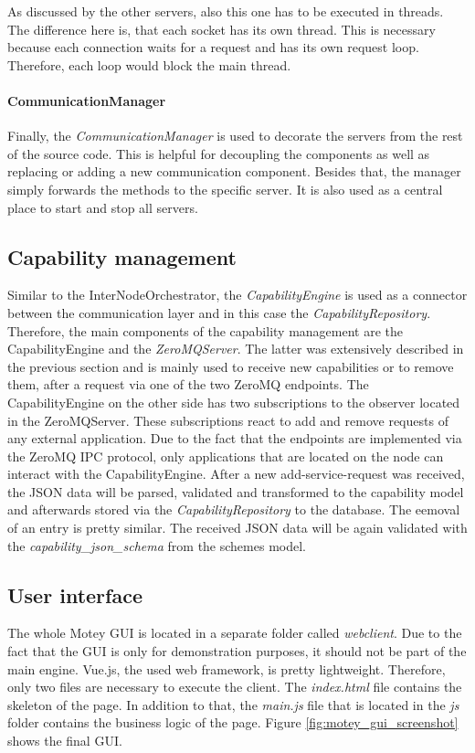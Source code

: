 As discussed by the other servers, also this one has to be executed in threads.
The difference here is, that each socket has its own thread.
This is necessary because each connection waits for a request and has its own request loop.
Therefore, each loop would block the main thread.

\paragraph{CommunicationManager}
Finally, the \textit{CommunicationManager} is used to decorate the servers from the rest of the source code.
This is helpful for decoupling the components as well as replacing or adding a new communication component.
Besides that, the manager simply forwards the methods to the specific server.
It is also used as a central place to start and stop all servers.


\subsection{Capability management}
Similar to the InterNodeOrchestrator, the \textit{CapabilityEngine} is used as a connector between the communication layer and in this case the \textit{CapabilityRepository}.
Therefore, the main components of the capability management are the CapabilityEngine and the \textit{ZeroMQServer}.
The latter was extensively described in the previous section and is mainly used to receive new capabilities or to remove them, after a request via one of the two ZeroMQ endpoints.
The CapabilityEngine on the other side has two subscriptions to the observer located in the ZeroMQServer.
These subscriptions react to add and remove requests of any external application.
Due to the fact that the endpoints are implemented via the ZeroMQ \ac{IPC} protocol, only applications that are located on the node can interact with the CapabilityEngine.
After a new add-service-request was received, the \ac{JSON} data will be parsed, validated and transformed to the capability model and afterwards stored via the \textit{CapabilityRepository} to the database.
The eemoval of an entry is pretty similar.
The received \ac{JSON} data will be again validated with the \textit{capability\_json\_schema} from the schemes model.


\subsection{User interface}
The whole Motey \ac{GUI} is located in a separate folder called \textit{webclient}.
Due to the fact that the \ac{GUI} is only for demonstration purposes, it should not be part of the main engine.
Vue.js, the used web framework, is pretty lightweight.
Therefore, only two files are necessary to execute the client.
The \textit{index.html} file contains the skeleton of the page.
In addition to that, the \textit{main.js} file that is located in the \textit{js} folder contains the business logic of the page.
Figure \ref{fig:motey_gui_screenshot} shows the final \ac{GUI}.\newline

